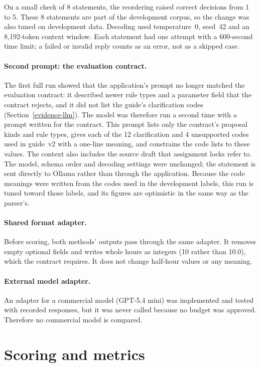 On a small check of 8 statements, the reordering raised correct decisions from 1 to 5. These 8 statements are part of the development corpus, so the change was also tuned on development data. Decoding used temperature~0, seed~42 and an 8{,}192-token context window. Each statement had one attempt with a 600-second time limit; a failed or invalid reply counts as an error, not as a skipped case.

\paragraph{Second prompt: the evaluation contract.} The first full run showed that the application's prompt no longer matched the evaluation contract: it described newer rule types and a parameter field that the contract rejects, and it did not list the guide's clarification codes (Section~\ref{evidence-llm}). The model was therefore run a second time with a prompt written for the contract. This prompt lists only the contract's proposal kinds and rule types, gives each of the 12 clarification and 4 unsupported codes used in guide~v2 with a one-line meaning, and constrains the code lists to these values. The context also includes the source draft that assignment locks refer to. The model, schema order and decoding settings were unchanged; the statement is sent directly to Ollama rather than through the application. Because the code meanings were written from the codes used in the development labels, this run is tuned toward those labels, and its figures are optimistic in the same way as the parser's.

\paragraph{Shared format adapter.} Before scoring, both methods' outputs pass through the same adapter. It removes empty optional fields and writes whole hours as integers (10 rather than 10.0), which the contract requires. It does not change half-hour values or any meaning.

\paragraph{External model adapter.} An adapter for a commercial model (GPT-5.4 mini) was implemented and tested with recorded responses, but it was never called because no budget was approved. Therefore no commercial model is compared.

\section{Scoring and metrics}\label{metrics}


